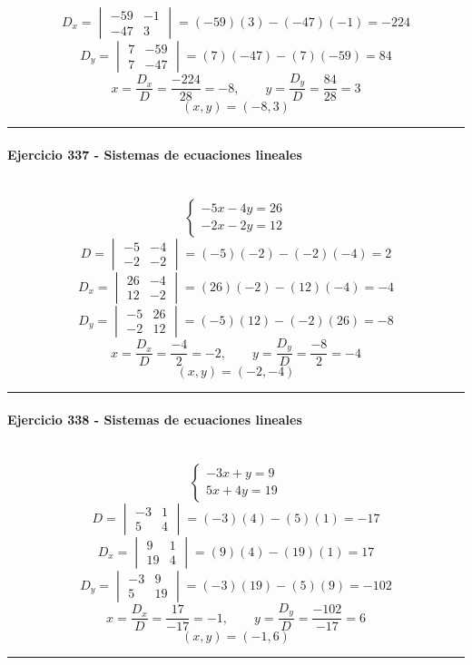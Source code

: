 \documentclass[10pt,a4paper]{article}
\newcommand{\res}[1]{\paragraph{#1}\mbox{}\\[-1.2em]}
\begin{document}
\[ D_x=\begin{vmatrix}-59&-1\\-47&3\end{vmatrix}=(-59)(3)-(-47)(-1)=-224 \]
\[ D_y=\begin{vmatrix}7&-59\\7&-47\end{vmatrix}=(7)(-47)-(7)(-59)=84 \]
\[ x=\frac{D_x}{D}=\frac{-224}{28}=-8,\qquad y=\frac{D_y}{D}=\frac{84}{28}=3 \]
\[ \boxed{(x,y)=(-8,3)} \]
\vspace{1mm}\hrule\vspace{2mm}
\res{Ejercicio 337 - Sistemas de ecuaciones lineales}
\[ \begin{cases}- 5 x - 4 y=26\\- 2 x - 2 y=12\end{cases} \]
\[ D=\begin{vmatrix}-5&-4\\-2&-2\end{vmatrix}=(-5)(-2)-(-2)(-4)=2 \]
\[ D_x=\begin{vmatrix}26&-4\\12&-2\end{vmatrix}=(26)(-2)-(12)(-4)=-4 \]
\[ D_y=\begin{vmatrix}-5&26\\-2&12\end{vmatrix}=(-5)(12)-(-2)(26)=-8 \]
\[ x=\frac{D_x}{D}=\frac{-4}{2}=-2,\qquad y=\frac{D_y}{D}=\frac{-8}{2}=-4 \]
\[ \boxed{(x,y)=(-2,-4)} \]
\vspace{1mm}\hrule\vspace{2mm}
\res{Ejercicio 338 - Sistemas de ecuaciones lineales}
\[ \begin{cases}- 3 x + y=9\\5 x + 4 y=19\end{cases} \]
\[ D=\begin{vmatrix}-3&1\\5&4\end{vmatrix}=(-3)(4)-(5)(1)=-17 \]
\[ D_x=\begin{vmatrix}9&1\\19&4\end{vmatrix}=(9)(4)-(19)(1)=17 \]
\[ D_y=\begin{vmatrix}-3&9\\5&19\end{vmatrix}=(-3)(19)-(5)(9)=-102 \]
\[ x=\frac{D_x}{D}=\frac{17}{-17}=-1,\qquad y=\frac{D_y}{D}=\frac{-102}{-17}=6 \]
\[ \boxed{(x,y)=(-1,6)} \]
\vspace{1mm}\hrule\vspace{2mm}
\end{document}
